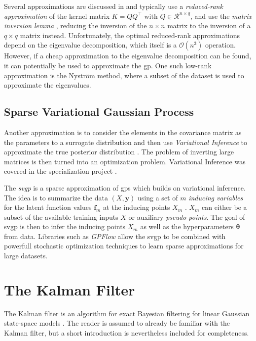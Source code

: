 Several approximations are discussed in \cite{rasmussen} and typically use a \textit{reduced-rank approximation} of the kernel matrix $K=Q Q^\intercal$ with $Q \in \mathcal{R}^{n \times q}$, and use the \textit{matrix inversion lemma} \cite[p.~201]{rasmussen}, reducing the inversion of the $n \times n$ matrix to the inversion of a $q \times q$ matrix instead. Unfortunately, the optimal reduced-rank approximations depend on the eigenvalue decomposition, which itself is a $\mathcal{O}(n^3)$ operation. However, if a cheap approximation to the eigenvalue decomposition can be found, it can potentially be used to approximate the \acrshort{gp}. One such low-rank approximation is the Nyström method, where a subset of the dataset is used to approximate the eigenvalues.    

\subsection{Sparse Variational Gaussian Process}
Another approximation is to consider the elements in the covariance matrix as the parameters to a surrogate distribution and then use \textit{Variational Inference} to approximate the true posterior distribution \cite{tran2016variational}. The problem of inverting large matrices is then turned into an optimization problem. Variational Inference was covered in the specialization project \cite{mellbye}. 

The \textit{\acrfull{svgp}} is a sparse approximation of \acrshort{gp}s which builds on variational inference. 
The idea is to summarize the data $(X, \boldsymbol{y})$ using a set of $m$ \textit{inducing variables} for the latent function values $\boldsymbol{f}_m$ at the inducing points $X_m$ \cite{Titsias2008VariationalMS}. $X_m$ can either be a subset of the available training inputs $X$ or auxiliary \textit{pseudo-points}. The goal of \acrshort{svgp} is then to infer the inducing points $X_m$ as well as the hyperparameters $\boldsymbol{\theta}$ from data. Libraries such as \textit{GPFlow} \cite{GPflow2017} allow the \acrshort{svgp} to be combined with powerfull stochastic optimization techniques to learn sparse approximations for large datasets.


\section{The Kalman Filter}
The Kalman filter is an algorithm for exact Bayesian filtering for linear Gaussian state-space models \cite{murphy}. The reader is assumed to already be familiar with the Kalman filter, but a short introduction is nevertheless included for completeness. 

